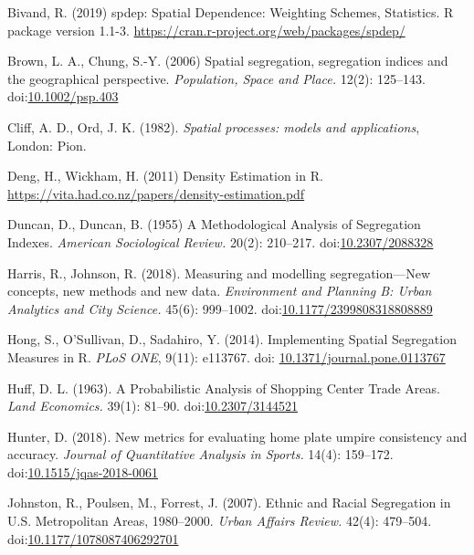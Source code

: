 \documentclass{article}
\theoremstyle{theorem}
\theoremstyle{definition}
\begin{document}
\begin{thebibliography}{3}

 Bivand, R. (2019) spdep: Spatial Dependence: Weighting Schemes, Statistics. R package version 1.1-3. \href{https://cran.r-project.org/web/packages/spdep}{\url{https://cran.r-project.org/web/packages/spdep/}}

Brown, L. A., Chung, S.-Y. (2006) Spatial segregation, segregation indices and the geographical perspective. \textit{Population, Space and Place.} 12(2): 125--143. doi:\href{https://doi.org/10.1002/psp.403}{10.1002/psp.403}

Cliff, A. D., Ord, J. K. (1982). \textit{Spatial processes: models and applications}, London: Pion.

 Deng, H., Wickham, H. (2011) Density Estimation in R. \href{https://vita.had.co.nz/papers/density-estimation.pdf}{\url{https://vita.had.co.nz/papers/density-estimation.pdf}}

 Duncan, D., Duncan, B. (1955) A Methodological Analysis of Segregation Indexes. \textit{American Sociological Review.} 20(2): 210--217. doi:\href{http://dx.doi.org/10.2307/2088328}{10.2307/2088328}

Harris, R., Johnson, R. (2018). Measuring and modelling segregation---New concepts, new methods and new data. \textit{Environment and Planning B: Urban Analytics and City Science.} 45(6): 999--1002. doi:\href{http://dx.doi.org/10.1177/2399808318808889}{10.1177/2399808318808889}

 Hong, S., O'Sullivan, D., Sadahiro, Y. (2014). Implementing Spatial Segregation Measures in R. \textit{PLoS ONE}, 9(11): e113767. doi: \href{http://dx.doi.org/10.1371/journal.pone.0113767}{10.1371/journal.pone.0113767}

 Huff, D. L. (1963). A Probabilistic Analysis of Shopping Center Trade Areas. \textit{Land Economics.} 39(1): 81--90. doi:\href{https://doi.org/10.2307/3144521}{10.2307/3144521}

 Hunter, D. (2018). New metrics for evaluating home plate umpire consistency and accuracy. \textit{Journal of Quantitative Analysis in Sports.} 14(4): 159--172. doi:\href{http://dx.doi.org/10.1515/jqas-2018-0061}{10.1515/jqas-2018-0061}

Johnston, R., Poulsen, M., Forrest, J. (2007). Ethnic and Racial Segregation in U.S. Metropolitan Areas, 1980--2000. \textit{Urban Affairs Review.} 42(4): 479--504. doi:\href{https://doi.org/10.1177/1078087406292701}{10.1177/1078087406292701}


\end{thebibliography}
\end{document}
